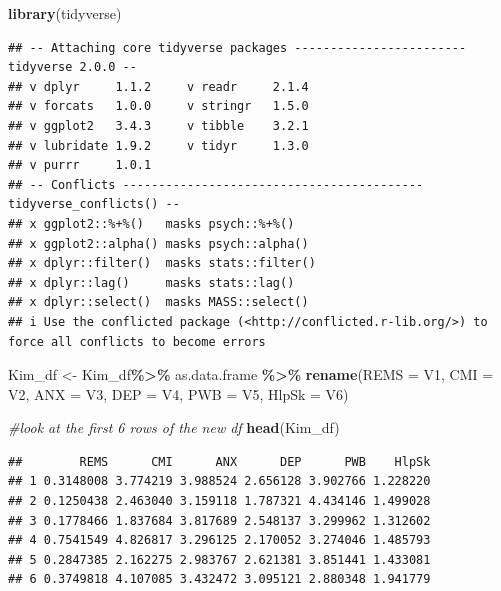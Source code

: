 \documentclass[
  11pt,
]{book}
\newenvironment{Shaded}{\begin{snugshade}}{\end{snugshade}}
\newcommand{\AttributeTok}[1]{\textcolor[rgb]{0.27,0.27,0.27}{#1}}
\newcommand{\CommentTok}[1]{\textcolor[rgb]{0.37,0.37,0.37}{\textit{#1}}}
\newcommand{\FunctionTok}[1]{\textcolor[rgb]{0.27,0.27,0.27}{\textbf{#1}}}
\newcommand{\NormalTok}[1]{#1}
\newcommand{\OtherTok}[1]{\textcolor[rgb]{0.37,0.37,0.37}{#1}}
\newcommand{\SpecialCharTok}[1]{\textcolor[rgb]{0.43,0.43,0.43}{\textbf{#1}}}
\begin{document}
\begin{Shaded}
\begin{Highlighting}[]
\FunctionTok{library}\NormalTok{(tidyverse)}
\end{Highlighting}
\end{Shaded}

\begin{verbatim}
## -- Attaching core tidyverse packages ------------------------ tidyverse 2.0.0 --
## v dplyr     1.1.2     v readr     2.1.4
## v forcats   1.0.0     v stringr   1.5.0
## v ggplot2   3.4.3     v tibble    3.2.1
## v lubridate 1.9.2     v tidyr     1.3.0
## v purrr     1.0.1     
## -- Conflicts ------------------------------------------ tidyverse_conflicts() --
## x ggplot2::%+%()   masks psych::%+%()
## x ggplot2::alpha() masks psych::alpha()
## x dplyr::filter()  masks stats::filter()
## x dplyr::lag()     masks stats::lag()
## x dplyr::select()  masks MASS::select()
## i Use the conflicted package (<http://conflicted.r-lib.org/>) to force all conflicts to become errors
\end{verbatim}

\begin{Shaded}
\begin{Highlighting}[]
\NormalTok{Kim\_df }\OtherTok{\textless{}{-}}\NormalTok{ Kim\_df}\SpecialCharTok{\%\textgreater{}\%}
\NormalTok{  as.data.frame }\SpecialCharTok{\%\textgreater{}\%}
  \FunctionTok{rename}\NormalTok{(}\AttributeTok{REMS =}\NormalTok{ V1, }\AttributeTok{CMI =}\NormalTok{ V2, }\AttributeTok{ANX =}\NormalTok{ V3, }\AttributeTok{DEP =}\NormalTok{ V4, }\AttributeTok{PWB =}\NormalTok{ V5, }\AttributeTok{HlpSk =}\NormalTok{ V6)}
\end{Highlighting}
\end{Shaded}

\begin{Shaded}
\begin{Highlighting}[]
\CommentTok{\#look at the first 6 rows of the new df}
\FunctionTok{head}\NormalTok{(Kim\_df)}
\end{Highlighting}
\end{Shaded}

\begin{verbatim}
##        REMS      CMI      ANX      DEP      PWB    HlpSk
## 1 0.3148008 3.774219 3.988524 2.656128 3.902766 1.228220
## 2 0.1250438 2.463040 3.159118 1.787321 4.434146 1.499028
## 3 0.1778466 1.837684 3.817689 2.548137 3.299962 1.312602
## 4 0.7541549 4.826817 3.296125 2.170052 3.274046 1.485793
## 5 0.2847385 2.162275 2.983767 2.621381 3.851441 1.433081
## 6 0.3749818 4.107085 3.432472 3.095121 2.880348 1.941779
\end{verbatim}
\end{document}
